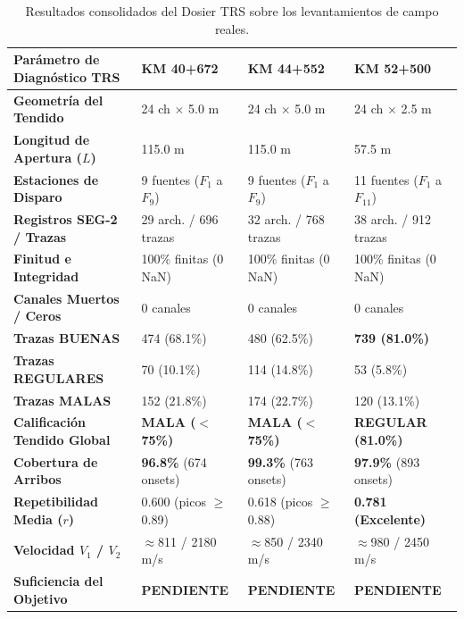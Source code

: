 \documentclass[11pt,a4paper]{article}
\begin{document}
\begin{table}[h!]
\centering
\small
\renewcommand{\arraystretch}{1.25}
\begin{tabularx}{\textwidth}{L{3.8cm} C{2.2cm} C{2.2cm} C{2.2cm}}
\toprule
\textbf{Parámetro de Diagnóstico TRS} & \textbf{KM 40+672} & \textbf{KM 44+552} & \textbf{KM 52+500} \\
\midrule
\textbf{Geometría del Tendido} & 24 ch $\times$ 5.0 m & 24 ch $\times$ 5.0 m & 24 ch $\times$ 2.5 m \\
\textbf{Longitud de Apertura ($L$)} & 115.0 m & 115.0 m & 57.5 m \\
\textbf{Estaciones de Disparo} & 9 fuentes ($F_1$ a $F_9$) & 9 fuentes ($F_1$ a $F_9$) & 11 fuentes ($F_1$ a $F_{11}$) \\
\textbf{Registros SEG-2 / Trazas} & 29 arch. / 696 trazas & 32 arch. / 768 trazas & 38 arch. / 912 trazas \\
\textbf{Finitud e Integridad} & 100\% finitas (0 NaN) & 100\% finitas (0 NaN) & 100\% finitas (0 NaN) \\
\textbf{Canales Muertos / Ceros} & 0 canales & 0 canales & 0 canales \\
\textbf{Trazas BUENAS} & 474 (68.1\%) & 480 (62.5\%) & \textbf{739 (81.0\%)} \\
\textbf{Trazas REGULARES} & 70 (10.1\%) & 114 (14.8\%) & 53 (5.8\%) \\
\textbf{Trazas MALAS} & 152 (21.8\%) & 174 (22.7\%) & 120 (13.1\%) \\
\textbf{Calificación Tendido Global} & \textcolor{badred}{\textbf{MALA ($<$75\%)}} & \textcolor{badred}{\textbf{MALA ($<$75\%)}} & \textcolor{reviewamber}{\textbf{REGULAR (81.0\%)}} \\
\textbf{Cobertura de Arribos} & \textbf{96.8\%} (674 onsets) & \textbf{99.3\%} (763 onsets) & \textbf{97.9\%} (893 onsets) \\
\textbf{Repetibilidad Media ($r$)} & 0.600 (picos $\ge$0.89) & 0.618 (picos $\ge$0.88) & \textbf{0.781 (Excelente)} \\
\textbf{Velocidad $V_1$ / $V_2$} & $\approx$811 / 2180 m/s & $\approx$850 / 2340 m/s & $\approx$980 / 2450 m/s \\
\textbf{Suficiencia del Objetivo} & \textbf{PENDIENTE} & \textbf{PENDIENTE} & \textbf{PENDIENTE} \\
\bottomrule
\end{tabularx}
\caption{Resultados consolidados del Dosier TRS sobre los levantamientos de campo reales.}
\label{tab:trs_km_results}
\end{table}
\end{document}

